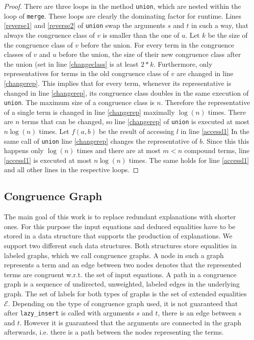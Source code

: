\begin{proof}

There are three loops in the method \texttt{union}, which are nested within the loop of \texttt{merge}.
These loops are clearly the dominating factor for runtime.
Lines \ref{reverse1} and \ref{reverse2} of \texttt{union} swap the arguments $s$ and $t$ in such a way, that always the congruence class of $v$ is smaller than the one of $u$.
Let $k$ be the size of the congruence class of $v$ before the union.
For every term in the congruence classes of $v$ and $u$ before the union, the size of their new congruence class after the union (set in line \ref{changeclass} is at least $2*k$.
Furthermore, only representatives for terms in the old congruence class of $v$ are changed in line \ref{changerep}.
This implies that for every term, whenever its representative is changed in line \ref{changerep}, its congruence class doubles in the same execution of \texttt{union}.
The maximum size of a congruence class is $n$.
Therefore the representative of a single term is changed in line \ref{changerep} maximally $\log(n)$ times.
There are $n$ terms that can be changed, so line \ref{changerep} of \texttt{union} is executed at most $n \log(n)$ times.
Let $f(a,b)$ be the result of accessing $l$ in line \ref{accessl1}
In the same call of \texttt{union} line \ref{changerep} changes the representative of $b$.
Since this this happens only $\log(n)$ times and there are at most $m < n$ compound terms, line \ref{accessl1} is executed at most $n \log(n)$ times.
The same holds for line \ref{accessl1} and all other lines in the respective loops.

\end{proof}


\FloatBarrier

\subsection*{Congruence Graph}
\label{sec:congruencegraph}
The main goal of this work is to replace redundant explanations with shorter ones.
For this purpose the input equations and deduced equalities have to be stored in a data structure that supports the production of explanations.
We support two different such data structures.
Both structures store equalities in labeled graphs, which we call congruence graphs.
A node in such a graph represents a term and an edge between two nodes denotes that the represented terms are congruent w.r.t. the set of input equations.
A path in a congruence graph is a sequence of undirected, unweighted, labeled edges in the underlying graph.
The set of labels for both types of graphs is the set of extended equalities $\mathcal{E}$.
Depending on the type of congruence graph used, it is not guaranteed that after \texttt{lazy\_insert} is called with arguments $s$ and $t$, there is an edge between $s$ and $t$.
However it is guaranteed that the arguments are connected in the graph afterwards, i.e. there is a path between the nodes representing the terms.

